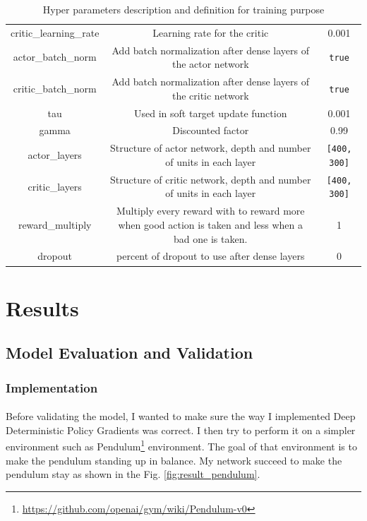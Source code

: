 \documentclass{article}
\begin{document}
\begin{table}[ht]
\begin{adjustbox}{width=1\textwidth}
\begin{tabular}{ |c|c|c| }
      critic\_learning\_rate & Learning rate for the critic & 0.001 \\
      actor\_batch\_norm & Add batch normalization after dense layers of the actor network & \verb?true? \\
      critic\_batch\_norm & Add batch normalization after dense layers of the critic network & \verb?true? \\
      tau & Used in soft target update function & 0.001 \\
      gamma & Discounted factor & 0.99 \\
      actor\_layers & Structure of actor network, depth and number of units in each layer & \verb?[400, 300]? \\
      critic\_layers & Structure of critic network, depth and number of units in each layer & \verb?[400, 300]? \\
      reward\_multiply & Multiply every reward with to reward more when good action is taken and less when a bad one is taken. & 1 \\
      dropout & percent of dropout to use after dense layers & 0 \\
      \hline
    \end{tabular}
  \end{adjustbox}
  \caption{Hyper parameters description and definition for training purpose}
  \label{tab:hyperparams}
\end{table}

\section{Results}

\subsection{Model Evaluation and Validation}

\subsubsection{Implementation}

\paragraph{}
Before validating the model, I wanted to make sure the way I implemented Deep
Deterministic Policy Gradients was correct. I then try to perform it on a
simpler environment such as
Pendulum\footnote{\url{https://github.com/openai/gym/wiki/Pendulum-v0}}
environment. The goal of that environment is to make the pendulum standing up in
balance. My network succeed to make the pendulum stay as shown in the Fig. \ref{fig:result_pendulum}.
\end{document}
